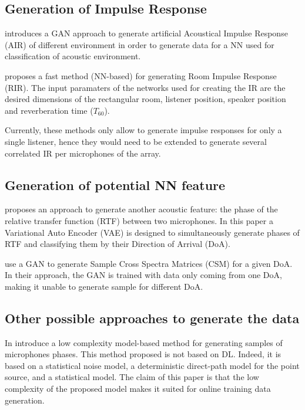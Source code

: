 \documentclass[11pt,a4paper,twoside]{report}
\begin{document}
\subsection{Generation of Impulse Response}

\cite{papayiannis2019data} introduces a GAN approach to generate artificial Acoustical Impulse Response (AIR) of different environment in order to generate data for a NN used for classification of acoustic environment.

\cite{ratnarajah2021fast} proposes a fast method (NN-based) for generating Room Impulse Response (RIR). The input paramaters of the networks used for creating the IR are the desired dimensions of the rectangular room, listener position, speaker position and reverberation time ($T_{60}$).

Currently, these methods only allow to generate impulse responses for only a single listener, hence they would need to be extended to generate several correlated IR per microphones of the array.

\subsection{Generation of potential NN feature}

\cite{bianco2020semi} proposes an approach to generate another acoustic feature: the phase of the relative transfer function (RTF) between two microphones. In this paper a Variational Auto Encoder (VAE) is designed to simultaneously generate phases of RTF and classifying them by their Direction of Arrival (DoA).

\cite{gerstoft2020parametric} use a GAN to generate Sample Cross Spectra Matrices (CSM) for a given DoA. In their approach, the GAN is trained with data only coming from one DoA, making it unable to generate sample for different DoA.

\subsection{Other possible approaches to generate the data}

In \cite{hubner2021efficient} introduce a low complexity model-based method for generating samples of microphones phases. This method proposed is not based on DL. Indeed, it is based on a statistical noise model, a deterministic direct-path model for the point source, and a statistical model. The claim of this paper is that the low complexity of the proposed  model makes it suited for online training data generation. 
\end{document}
